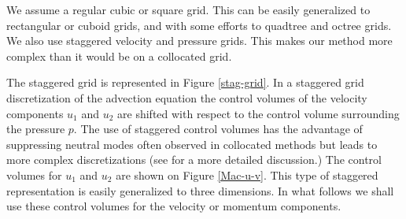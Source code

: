We assume a regular cubic or square grid. This can be easily
generalized to rectangular or cuboid grids, and with some efforts to
quadtree and octree grids. We also use staggered velocity and pressure
grids. This makes our method more complex than it would be on a
collocated grid. 

The staggered grid is represented in Figure \ref{stag-grid}. In a staggered
grid discretization of the advection equation
the control volumes of the velocity components $u_1$ and $u_2$ are shifted with respect to the
control volume surrounding the pressure $p$.
The use of staggered control volumes has the advantage of
suppressing neutral modes often observed in collocated methods but
leads to more complex discretizations (see \cite{Tryggvason11} for a
more detailed discussion.) The control volumes for $u_1$ and $u_2$ are
shown on Figure \ref{Mac-u-v}. This type of staggered representation
is easily generalized to three dimensions. In what follows we shall
use these control volumes for the velocity or momentum components.

